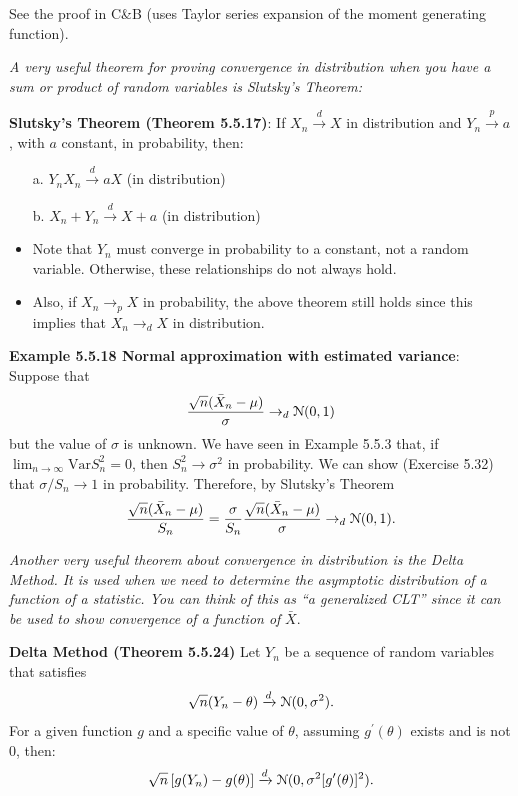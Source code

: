 \documentclass[11pt,]{article}
\providecommand{\tightlist}{%
  \setlength{\itemsep}{0pt}\setlength{\parskip}{0pt}}
\def\Xbar{\bar{ X}}
\def\Nsc{{\cal N}}
\def\Var{\mbox{Var}}
\begin{document}
See the proof in C\&B (uses Taylor series expansion of the moment
generating function).

\emph{A very useful theorem for proving convergence in distribution when
you have a sum or product of random variables is Slutsky's Theorem:}

\textbf{Slutsky's Theorem (Theorem 5.5.17)}: If
\(X_n \xrightarrow{d} X\) in distribution and \(Y_n \xrightarrow{p} a\),
with \(a\) constant, in probability, then:

\begin{itemize}
\item[a.] $Y_n X_n \xrightarrow{d}  aX$ (in distribution)
\item[b.] $X_n + Y_n \xrightarrow{d}  X + a$ (in distribution)
\end{itemize}

\begin{itemize}
\tightlist
\item
  Note that \(Y_n\) must converge in probability to a constant, not a
  random variable. Otherwise, these relationships do not always hold.
\item
  Also, if \(X_n \to_p X\) in probability, the above theorem still holds
  since this implies that \(X_n \to_d X\) in distribution.
\end{itemize}

\noindent\textbf{Example 5.5.18 Normal approximation with estimated variance}:
Suppose that
\[\frac{\sqrt{n} (\Xbar_n - \mu) }{\sigma} \to_d \Nsc(0,1)\] but the
value of \(\sigma\) is unknown. We have seen in Example 5.5.3 that, if
\(\lim_{n\to\infty} \Var S_n^2 = 0\), then \(S_n^2 \to \sigma^2\) in
probability. We can show (Exercise 5.32) that \(\sigma/S_n \to 1\) in
probability. Therefore, by Slutsky's Theorem
\[\frac{\sqrt{n} (\Xbar_n - \mu) }{S_n} = \frac{\sigma}{S_n}\frac{\sqrt{n} (\Xbar_n - \mu) }{\sigma} \to_d \Nsc(0,1).\]

\emph{Another very useful theorem about convergence in distribution is
the Delta Method. It is used when we need to determine the asymptotic
distribution of a function of a statistic. You can think of this as ``a
generalized CLT'' since it can be used to show convergence of a function
of} \(\Xbar\).

\textbf{Delta Method (Theorem 5.5.24)} Let \(Y_n\) be a sequence of
random variables that satisfies
\[\sqrt{n}(Y_n - \theta) \xrightarrow{d} \Nsc(0,\sigma^2).\] For a given
function \(g\) and a specific value of \(\theta\), assuming
\(g^\prime(\theta)\) exists and is not 0, then:
\[\sqrt{n}\left[g(Y_n) - g(\theta)\right] \xrightarrow{d} \Nsc(0, \sigma^2[g^\prime(\theta)]^2).\]
\end{document}
